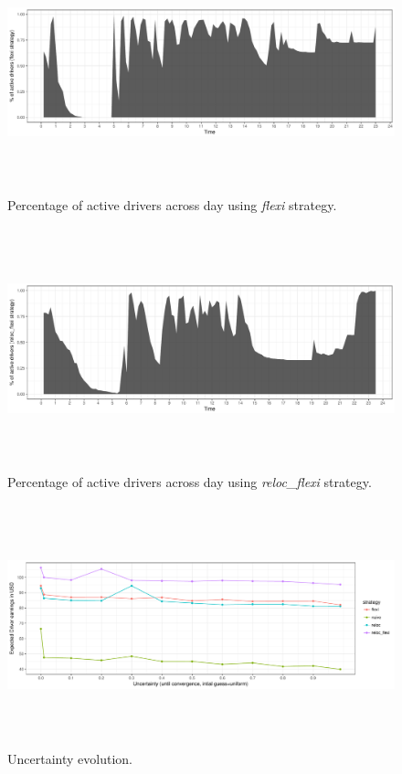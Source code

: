 \begin{figure}
	\label{fig:flexi_schedules}
	\caption{Percentage of active drivers across day using \textit{flexi} strategy.}
	\includegraphics[width=\textwidth,height=7cm]{figures/flexi_schedules.pdf}
\end{figure}

\begin{figure}
	\label{fig:reloc_flexi_schedules}
	\caption{Percentage of active drivers across day using \textit{reloc\_flexi} strategy.}
	\includegraphics[width=\textwidth,height=7cm]{figures/reloc_flexi_schedules.pdf}
\end{figure}

\begin{figure}
	\label{fig:uncertainty_evolution}
	\caption{Uncertainty evolution.}
	\includegraphics[width=\textwidth,height=7cm]{figures/uncertainty_evolution.pdf}
\end{figure}

